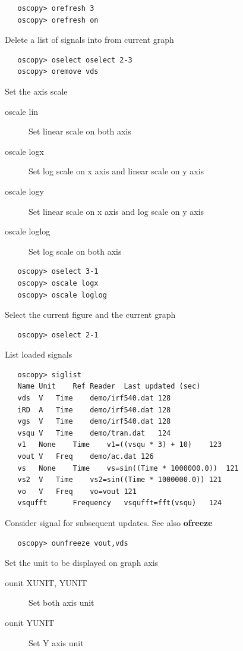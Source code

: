 \documentclass[a4paper,11pt]{article}
\begin{document}
\begin{verbatim}
   oscopy> orefresh 3
   oscopy> orefresh on
\end{verbatim}

   Delete a list of signals into from current graph
\begin{verbatim}
   oscopy> oselect oselect 2-3
   oscopy> oremove vds
\end{verbatim}

   Set the axis scale
   \begin{description}
   \item[oscale lin] Set linear scale on both axis
   \item[oscale logx] Set log scale on x axis and linear scale on y axis
   \item[oscale logy] Set linear scale on x axis and log scale on y axis
   \item[oscale loglog] Set log scale on both axis
   \end{description}

\begin{verbatim}
   oscopy> oselect 3-1
   oscopy> oscale logx
   oscopy> oscale loglog
\end{verbatim}

   Select the current figure and the current graph
\begin{verbatim}
   oscopy> oselect 2-1
\end{verbatim}

   List loaded signals
\begin{verbatim}
   oscopy> siglist
   Name	Unit	Ref	Reader	Last updated (sec)
   vds	V	Time	demo/irf540.dat	128
   iRD	A	Time	demo/irf540.dat	128
   vgs	V	Time	demo/irf540.dat	128
   vsqu	V	Time	demo/tran.dat	124
   v1	None	Time	v1=((vsqu * 3) + 10)	123
   vout	V	Freq	demo/ac.dat	126
   vs	None	Time	vs=sin((Time * 1000000.0))	121
   vs2	V	Time	vs2=sin((Time * 1000000.0))	121
   vo	V	Freq	vo=vout	121
   vsqufft		Frequency	vsqufft=fft(vsqu)	124
\end{verbatim}

   Consider signal for subsequent updates. See also \textbf{ofreeze}
\begin{verbatim}
   oscopy> ounfreeze vout,vds
\end{verbatim}

   Set the unit to be displayed on graph axis
   \begin{description}
   \item[ounit XUNIT, YUNIT] Set both axis unit
   \item[ounit YUNIT] Set Y axis unit
   \end{description}
\end{document}
